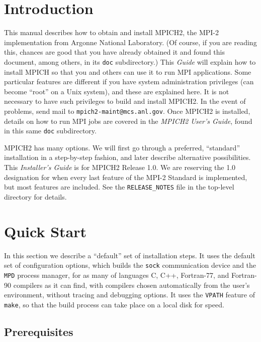 \documentclass[dvipdfm,11pt]{article}
\begin{document}
\section{Introduction}
\label{sec:intro}
This manual describes how to obtain and install MPICH2, the MPI-2
implementation from Argonne National Laboratory.  (Of course, if you are
reading this, chances are good that you have already obtained it and
found this document, among others, in its \texttt{doc} subdirectory.)
This \emph{Guide} will explain how to install MPICH so that you and others can use it to
run MPI applications.  Some particular features are different
if you have system administration privileges (can become ``root'' on a
Unix system), and these are explained here.  It is not necessary to have
such privileges to build and install MPICH2.  In the event of problems,
send mail to \texttt{mpich2-maint@mcs.anl.gov}.  Once MPICH2 is
installed, details on how to run MPI jobs are covered in the \emph{MPICH2
User's Guide}, found in this same \texttt{doc} subdirectory.

MPICH2 has many options.  We will first go through a preferred,
``standard'' installation in a step-by-step fashion, and later describe
alternative possibilities.  This \emph{Installer's Guide} is for MPICH2
Release 1.0.  We are reserving the 1.0 designation for when every last
feature of the MPI-2 Standard is implemented, but most features are
included.  See the \texttt{RELEASE\_NOTES} file in the top-level
directory for details.


\section{Quick Start}
\label{sec:quick}

In this section we describe a ``default'' set of installation steps.  It
uses the default set of configuration options, which builds the \texttt{sock}
communication device and the \texttt{MPD} process manager, for as many
of languages C, C++, Fortran-77, and Fortran-90 compilers as it can
find, with compilers chosen automatically from the user's environment,
without tracing and debugging options.  It uses the \texttt{VPATH}
feature of \texttt{make}, so that the build process can take place on
a local disk for speed.

\subsection{Prerequisites}
\label{sec:prerequisites}
\end{document}
